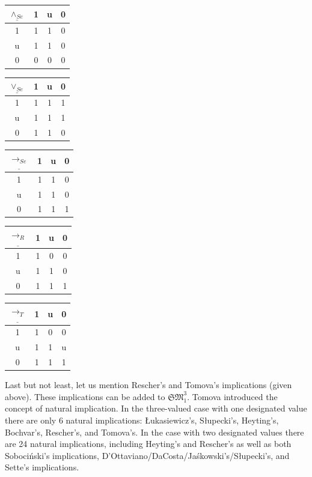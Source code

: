 \documentclass[11pt,a4paper,titlepage]{article}
\theoremstyle{definition}
\newcommand{\3}{\vspace{.3in}}
\newcommand{\2}{\vspace{.2in}}
\newcommand{\1}{\vspace{.1in}}
\newcommand{\5}{\vspace{.05in}}
\begin{document}
	
	\begin{center}
		\begin{tabular}{|c|ccc|}
			\hline
			$\underline{\wedge_{Se}} $ & 1 & u & 0 \\
			\hline
			1 & 1 & 1 & 0 \\
			u & 1 & 1 & 0 \\
			0 & 0 & 0 & 0 \\
			\hline
		\end{tabular}
		\begin{tabular}{|c|ccc|}
			\hline$\underline{\vee_{Se}} $ & 1 & u & 0 \\\hline
			1 & 1 & 1 & 1 \\
			u & 1 & 1 & 1 \\
			0 & 1 & 1 & 0 \\\hline
		\end{tabular}
		\begin{tabular}{|c|ccc|}
			\hline
			$\underline{\rightarrow_{Se}} $ & 1 & u & 0 \\
			\hline
			1 & 1 & 1 & 0 \\
			u & 1 & 1 & 0 \\
			0 & 1 & 1 & 1 \\
			\hline
		\end{tabular}
\end{center} 
\begin{center}		
	\begin{tabular}{|c|ccc|}
		\hline
		$\underline{\rightarrow_R} $ & 1 & u & 0 \\
		\hline
		1 & 1 & 0 & 0 \\
		u & 1 & 1 & 0 \\
		0 & 1 & 1 & 1 \\
		\hline
	\end{tabular}
	\begin{tabular}{|c|ccc|}
		\hline
		$\underline{\rightarrow_T} $ & 1 & u & 0 \\
		\hline
		1 & 1 & 0 & 0 \\
		u & 1 & 1 & u \\
		0 & 1 & 1 & 1 \\
		\hline
	\end{tabular}
	
\end{center}

Last but not least, let us mention Rescher's \cite{Rescher} and Tomova's \cite{Tomova12} implications (given above). These implications can be added to $\mathfrak{SM}_1^3$. Tomova \cite{Tomova12} introduced the concept of natural implication. In the three-valued case with one designated value there are only 6 natural implications: \L ukasiewicz's, S\l{}upecki's, Heyting's, Bochvar's, Rescher's, and Tomova's. In the case with two designated values there are 24 natural implications, including Heyting's and Rescher's as well as both Soboci\'{n}ski's implications, D'Ottaviano/DaCosta/Ja\'{s}kowski's/S\l{}upecki's, and Sette's implications.
\end{document}
